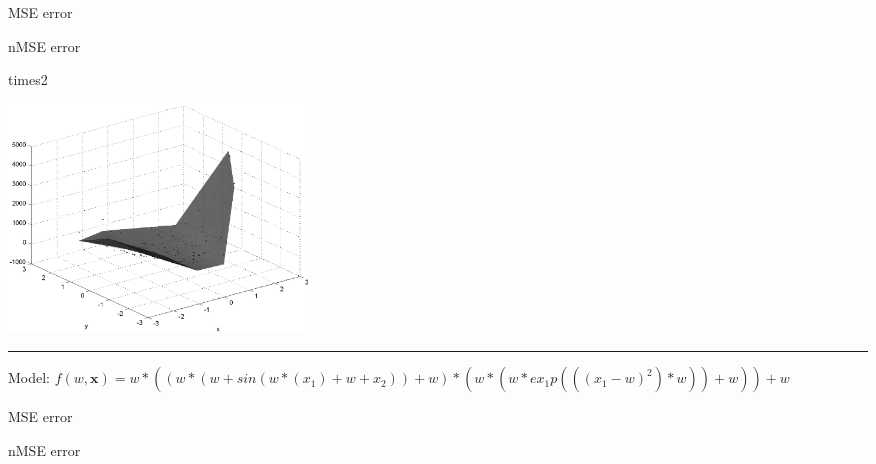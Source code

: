 \documentclass[12pt]{article}
\begin{document}
MSE error

nMSE error

\begin{multicols}{2}
\begin{bundle}{times2}\end{bundle}

\columnbreak
\includegraphics[width=8cm]{2.eps}
\end{multicols}

\hrule
\vspace{1cm}
Model: $f(w,\mathbf{x})=w*((w*(w+sin(w*(x_1)+w+x_2))+w)*(w*(w*ex_1p(((x_1-w)^2)*w))+w))+w$

MSE error

nMSE error
\end{document}
